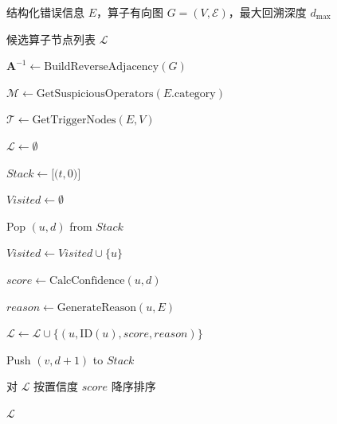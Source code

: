 \begin{algorithm}[H]

\caption{基于DFS回溯的候选算子定位算法}

\label{alg:dfs_fault_locator}

\small\linespread{1.0}\selectfont

\begin{algorithmic}[1]

\REQUIRE 结构化错误信息 $E$，算子有向图 $G=(V,\mathcal{E})$，最大回溯深度 $d_{\text{max}}$

\ENSURE 候选算子节点列表 $\mathcal{L}$

\STATE $\mathbf{A}^{-1} \leftarrow \text{BuildReverseAdjacency}(G)$

\STATE $\mathcal{M} \leftarrow \text{GetSuspiciousOperators}(E.\text{category})$

\STATE $\mathcal{T} \leftarrow \text{GetTriggerNodes}(E, V)$

\STATE $\mathcal{L} \leftarrow \emptyset$


    \STATE $Stack \leftarrow \text{[(}t, 0\text{)]}$

    \STATE $Visited \leftarrow \emptyset$


        \STATE Pop $(u, d)$ from $Stack$


            \STATE $Visited \leftarrow Visited \cup \{u\}$


                \STATE $score \leftarrow \text{CalcConfidence}(u, d)$

                \STATE $reason \leftarrow \text{GenerateReason}(u, E)$

                \STATE $\mathcal{L} \leftarrow \mathcal{L} \cup \{(u, \text{ID}(u), score, reason)\}$

            \ENDIF



                    \STATE Push $(v, d+1)$ to $Stack$

                \ENDFOR

            \ENDIF

        \ENDIF

    \ENDWHILE

\ENDFOR

\STATE 对 $\mathcal{L}$ 按置信度 $score$ 降序排序

\RETURN $\mathcal{L}$

\end{algorithmic}

\end{algorithm}

